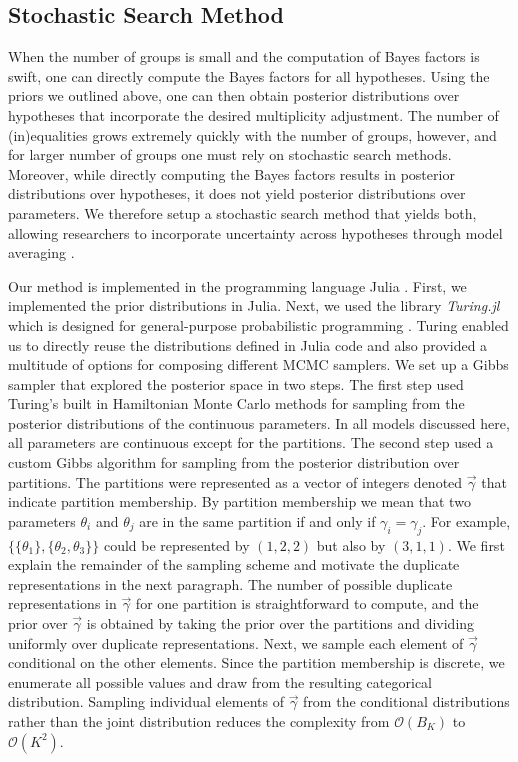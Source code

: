 \documentclass[11pt,a4paper]{article}
\theoremstyle{definition} %
\theoremstyle{case}
\begin{document}
\subsection{Stochastic Search Method} \label{sec:method-description}
When the number of groups is small and the computation of Bayes factors is swift, one can directly compute the Bayes factors for all hypotheses. Using the priors we outlined above, one can then obtain posterior distributions over hypotheses that incorporate the desired multiplicity adjustment. The number of (in)equalities grows extremely quickly with the number of groups, however, and for larger number of groups one must rely on stochastic search methods. Moreover, while directly computing the Bayes factors results in posterior distributions over hypotheses, it does not yield posterior distributions over parameters. We therefore setup a stochastic search method that yields both, allowing researchers to incorporate uncertainty across hypotheses through model averaging \parencite[e.g.,][]{hinne2020conceptual, hoeting1999bayesian}.

Our method is implemented in the programming language Julia \parencite{Julia2017Bezanson}. First, we implemented the prior distributions in Julia. Next, we used the library \emph{Turing.jl} which is designed for general-purpose probabilistic programming \parencite{Turing2018Ge}. Turing enabled us to directly reuse the distributions defined in Julia code and also provided a multitude of options for composing different MCMC samplers. We set up a Gibbs sampler that explored the posterior space in two steps. The first step used Turing's built in Hamiltonian Monte Carlo methods for sampling from the posterior distributions of the continuous parameters. In all models discussed here, all parameters are continuous except for the partitions. The second step used a custom Gibbs algorithm for sampling from the posterior distribution over partitions. The partitions were represented as a vector of integers denoted $\vec{\gamma}$ that indicate partition membership. By partition membership we mean that two parameters $\theta_i$ and $\theta_j$ are in the same partition if and only if $\gamma_i = \gamma_j$. For example, $\{\{\theta_1\}, \{\theta_2, \theta_3\}\}$ could be represented by $(1, 2, 2)$ but also by $(3, 1, 1)$. We first explain the remainder of the sampling scheme and motivate the duplicate representations in the next paragraph. The number of possible duplicate representations in $\vec{\gamma}$ for one partition is straightforward to compute, and the prior over $\vec{\gamma}$ is obtained by taking the prior over the partitions and dividing uniformly over duplicate representations. Next, we sample each element of $\vec{\gamma}$ conditional on the other elements. Since the partition membership is discrete, we enumerate all possible values and draw from the resulting categorical distribution. Sampling individual elements of $\vec{\gamma}$ from the conditional distributions rather than the joint distribution reduces the complexity from $\mathcal{O}(B_K)$ to $\mathcal{O}(K^2)$.
\end{document}
